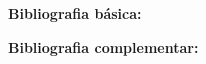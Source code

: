 \documentclass[class=article, crop=false]{standalone}
\begin{document}
\newrefsection
\textbf{Bibliografia básica:}
\nocite{2006-aho-etal,2002-appel,2004-louden}
\printbibliography

\newrefsection
\textbf{Bibliografia complementar:}
\nocite{2004-cooper-torczon,2008-ricarte,2000-grune-etal,1998-lewis-papadimitriou,2006-hopcroft-etal} 
\printbibliography
\end{document}
